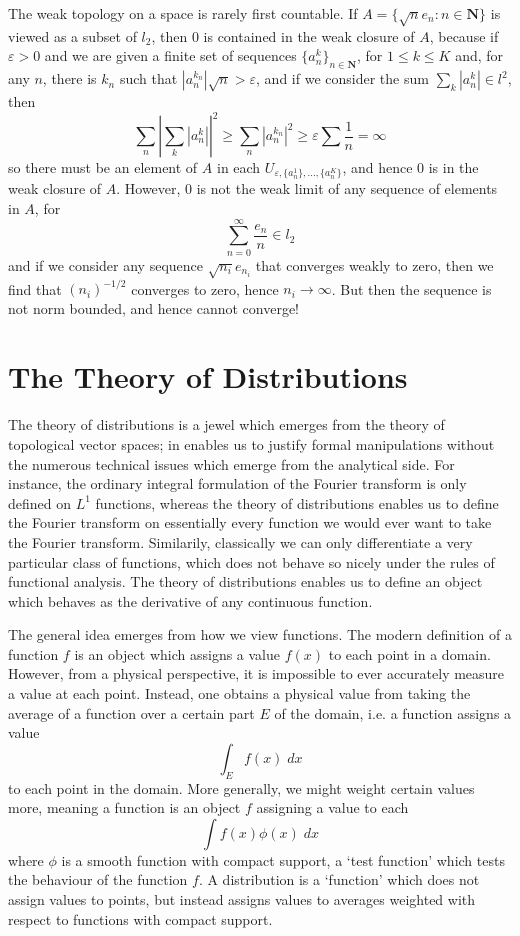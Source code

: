 \begin{example}
    The weak topology on a space is rarely first countable. If $A = \{ \sqrt{n} e_n : n \in \mathbf{N} \}$ is viewed as a subset of $l_2$, then 0 is contained in the weak closure of $A$, because if $\varepsilon > 0$ and we are given a finite set of sequences $\{ a_n^k \}_{n \in \mathbf{N}}$, for $1 \leq k \leq K$ and, for any $n$, there is $k_n$ such that $|a_n^{k_n}| \sqrt{n} > \varepsilon$, and if we consider the sum $\sum_k |a_n^k| \in l^2$, then
    \[ \sum_n \left|\sum_k |a_n^k| \right|^2 \geq \sum_n |a_n^{k_n}|^2 \geq \varepsilon \sum \frac{1}{n} = \infty \]
    so there must be an element of $A$ in each $U_{\varepsilon, \{ a_n^1 \}, \dots, \{ a_n^K \}}$, and hence $0$ is in the weak closure of $A$. However, 0 is not the weak limit of any sequence of elements in $A$, for
    \[ \sum_{n = 0}^\infty \frac{e_n}{n} \in l_2 \]
    and if we consider any sequence $\sqrt{n_i} e_{n_i}$ that converges weakly to zero, then we find that $(n_i)^{-1/2}$ converges to zero, hence $n_i \to \infty$. But then the sequence is not norm bounded, and hence cannot converge!
\end{example}









\chapter{The Theory of Distributions}

The theory of distributions is a jewel which emerges from the theory of topological vector spaces; in enables us to justify formal manipulations without the numerous technical issues which emerge from the analytical side. For instance, the ordinary integral formulation of the Fourier transform is only defined on $L^1$ functions, whereas the theory of distributions enables us to define the Fourier transform on essentially every function we would ever want to take the Fourier transform. Similarily, classically we can only differentiate a very particular class of functions, which does not behave so nicely under the rules of functional analysis. The theory of distributions enables us to define an object which behaves as the derivative of any continuous function.

The general idea emerges from how we view functions. The modern definition of a function $f$ is an object which assigns a value $f(x)$ to each point in a domain. However, from a physical perspective, it is impossible to ever accurately measure a value at each point. Instead, one obtains a physical value from taking the average of a function over a certain part $E$ of the domain, i.e. a function assigns a value
%
\[ \int_E f(x)\; dx \]
%
to each point in the domain. More generally, we might weight certain values more, meaning a function is an object $f$ assigning a value to each
%
\[ \int f(x) \phi(x)\; dx \]
%
where $\phi$ is a smooth function with compact support, a `test function' which tests the behaviour of the function $f$. A distribution is a `function' which does not assign values to points, but instead assigns values to averages weighted with respect to functions with compact support.

